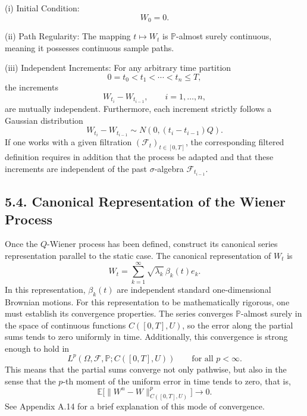 \documentclass[11pt]{article}
\theoremstyle{definition}
\theoremstyle{remark}
\begin{document}
\noindent (i) Initial Condition:
\[
W_0=0.
\]

\noindent (ii) Path Regularity: The mapping \(t\mapsto W_t\) is \(\mathbb P\)-almost surely continuous, meaning it possesses continuous sample paths.

\noindent (iii) Independent Increments: For any arbitrary time partition
\[
0=t_0<t_1<\cdots<t_n\le T,
\]
the increments
\[
W_{t_i}-W_{t_{i-1}},
\qquad i=1,\ldots,n,
\]
are mutually independent. Furthermore, each increment strictly follows a Gaussian distribution
\[
W_{t_i}-W_{t_{i-1}}\sim N(0,(t_i-t_{i-1})Q).
\]
If one works with a given filtration \((\mathcal F_t)_{t\in[0,T]}\), the corresponding filtered definition requires in addition that the process be adapted and that these increments are independent of the past \(\sigma\)-algebra \(\mathcal F_{t_{i-1}}\).

\subsection*{5.4. Canonical Representation of the Wiener Process}
Once the \(Q\)-Wiener process has been defined, construct its canonical series representation parallel to the static case. The canonical representation of \(W_t\) is
\[
W_t=\sum_{k=1}^\infty \sqrt{\lambda_k}\,\beta_k(t)e_k.
\]
In this representation, \(\beta_k(t)\) are independent standard one-dimensional Brownian motions. For this representation to be mathematically rigorous, one must establish its convergence properties. The series converges \(\mathbb P\)-almost surely in the space of continuous functions \(C([0,T],U)\), so the error along the partial sums tends to zero uniformly in time. Additionally, this convergence is strong enough to hold in
\[
L^p(\Omega,\mathcal F,\mathbb P;C([0,T],U))
\qquad \text{for all } p<\infty.
\]
This means that the partial sums converge not only pathwise, but also in the sense that the \(p\)-th moment of the uniform error in time tends to zero, that is,
\[
\mathbb E\bigl[\|W^n-W\|_{C([0,T],U)}^p\bigr]\to 0.
\]
See Appendix A.14 for a brief explanation of this mode of convergence.
\end{document}
